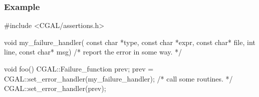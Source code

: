 \begin{ccAdvanced}
\ccGlueEnd

\subsubsection{Example}

\begin{cprog}
#include <CGAL/assertions.h>

void my_failure_handler(
    const char *type,
    const char *expr,
    const char* file,
    int line,
    const char* msg)
{
    /* report the error in some way. */
}

void foo()
{
    CGAL::Failure_function prev;
    prev = CGAL::set_error_handler(my_failure_handler);
    /* call some routines. */
    CGAL::set_error_handler(prev);
}
\end{cprog}

\end{ccAdvanced}

